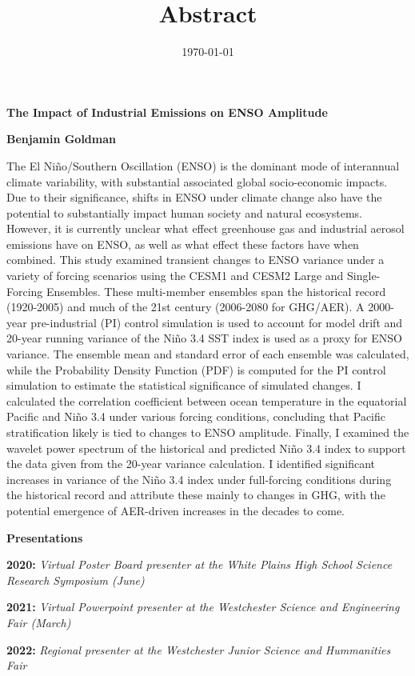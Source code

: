 \documentclass[11pt]{article}
\date{\today}
\title{Abstract}
\begin{document}
\begin{center}
\textbf{The Impact of Industrial Emissions on ENSO Amplitude}

\textbf{Benjamin Goldman}
\end{center}

The El Niño/Southern Oscillation (ENSO) is the dominant mode of interannual climate variability, with substantial associated global socio-economic impacts. Due to their significance, shifts in ENSO under climate change also have the potential to substantially impact human society and natural ecosystems. However, it is currently unclear what effect greenhouse gas and industrial aerosol emissions have on ENSO, as well as what effect these factors have when combined. This study examined transient changes to ENSO variance under a variety of forcing scenarios using the CESM1 and CESM2 Large and Single-Forcing Ensembles. These multi-member ensembles span the historical record (1920-2005) and much of the 21st century (2006-2080 for GHG/AER). A 2000-year pre-industrial (PI) control simulation is used to account for model drift and 20-year running variance of the Niño 3.4 SST index is used as a proxy for ENSO variance. The ensemble mean and standard error of each ensemble was calculated, while the Probability Density Function (PDF) is computed for the PI control simulation to estimate the statistical significance of simulated changes. I calculated the correlation coefficient between ocean temperature in the equatorial Pacific and Niño 3.4 under various forcing conditions, concluding that Pacific stratification likely is tied to changes to ENSO amplitude. Finally, I examined the wavelet power spectrum of the historical and predicted Niño 3.4 index to support the data given from the 20-year variance calculation. I identified significant increases in variance of the Niño 3.4 index under full-forcing conditions during the historical record and attribute these mainly to changes in GHG, with the potential emergence of AER-driven increases in the decades to come.

\begin{center}
\textbf{Presentations}
\end{center}

\textbf{2020:} \emph{Virtual Poster Board presenter at the White Plains High School Science Research Symposium (June)}

\textbf{2021:} \emph{Virtual Powerpoint presenter at the Westchester Science and Engineering Fair (March)}

\textbf{2022:} \emph{Regional presenter at the Westchester Junior Science and Hummanities Fair}
\end{document}
